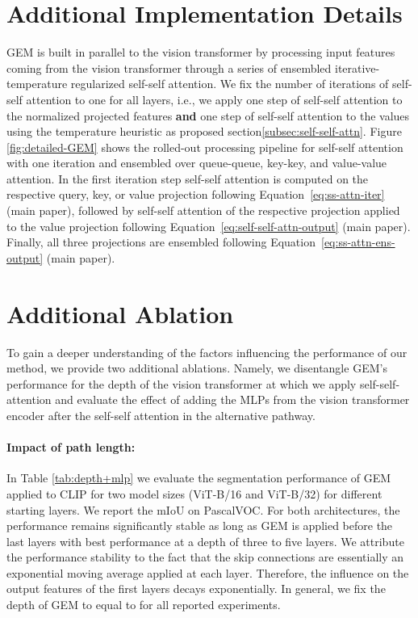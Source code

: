 \documentclass[10pt,twocolumn,letterpaper]{article}
\begin{document}
\section{Additional Implementation Details}
\label{appendix:implementation}

GEM is built in parallel to the vision transformer by processing input features coming from the vision transformer through a series of ensembled iterative-temperature regularized self-self attention. We fix the number of iterations of self-self attention to one for all layers, i.e., we apply one step of self-self attention to the normalized projected features \textbf{and} one step of self-self attention to the values using the temperature heuristic as proposed section\ref{subsec:self-self-attn}. Figure \ref{fig:detailed-GEM} shows the rolled-out processing pipeline for self-self attention with one iteration and ensembled over queue-queue, key-key, and value-value attention. In the first iteration step self-self attention is computed on the respective query, key, or value projection following Equation~\ref{eq:ss-attn-iter} (main paper), followed by self-self attention of the respective projection applied to the value projection following Equation~\ref{eq:self-self-attn-output} (main paper). Finally, all three projections are ensembled following Equation~\ref{eq:ss-attn-ens-output} (main paper).


\section{Additional Ablation}\label{appendix:ablation}
To gain a deeper understanding of the factors influencing the performance of our method, we provide two additional ablations. Namely, we disentangle GEM's performance for the depth of the vision transformer at which we apply self-self-attention and evaluate the effect of adding the MLPs from the vision transformer encoder after the self-self attention in the alternative pathway.

\paragraph{Impact of path length:}
In Table \ref{tab:depth+mlp} we evaluate the segmentation performance of GEM applied to CLIP for two model sizes (ViT-B/16 and ViT-B/32) for different starting layers. We report the mIoU on PascalVOC. For both architectures, the performance remains significantly stable as long as GEM is applied before the last layers with best performance at a depth of three to five layers. We attribute the performance stability to the fact that the skip connections are essentially an exponential moving average applied at each layer. Therefore, the influence on the output features of the first layers decays exponentially. In general, we fix the depth  of GEM to equal to  for all reported experiments.
\end{document}
